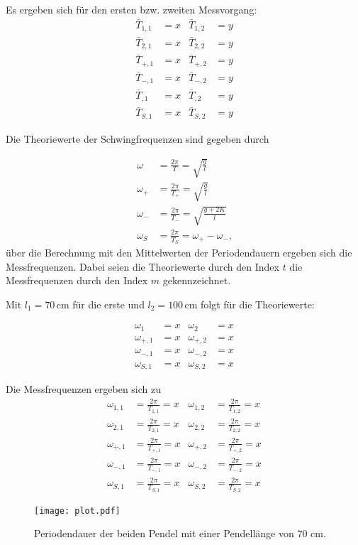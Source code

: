 Es ergeben sich für den ersten bzw. zweiten Messvorgang:
\begin{align}
  \bar{T}_{1,1} & = x  & \bar{T}_{1,2} & = y \\
  \bar{T}_{2,1} & = x  & \bar{T}_{2,2} & = y \\ 
  \bar{T}_{+,1} & = x  & \bar{T}_{+,2} & = y \\
  \bar{T}_{-,1} & = x  & \bar{T}_{-,2} & = y \\
  \bar{T}_{,1}  & = x  & \bar{T}_{,2}  & = y \\
  \bar{T}_{S,1} & = x  & \bar{T}_{S,2} & = y 
\end{align}

Die Theoriewerte der Schwingfrequenzen sind gegeben durch

\begin{align}
  \omega   & = \frac{2π}{T}     =   \sqrt{\frac{g}{l}} \\
  \omega_+ & = \frac{2π}{T_+} =   \sqrt{\frac{g}{l}} \\
  \omega_- & = \frac{2π}{T_-} =\sqrt{\frac{g+2K}{l}} \\
  \omega_S & = \frac{2π}{T_S} =  \omega_+ -\omega_- \text{,}
\end{align}
über die Berechnung mit den Mittelwerten der Periodendauern ergeben sich die Messfrequenzen. Dabei seien die Theoriewerte durch den Index $t$
die Messfrequenzen durch den Index $m$ gekennzeichnet.

Mit $l_1=70 \, \unit{\centi\meter}$ für die erste und $l_2= 100 \, \unit{\centi\meter}$ folgt für die Theoriewerte:

\begin{align}
\omega_1 & = x & \omega_2 & = x \\
\omega_{+,1} & = x & \omega_{+,2} & = x \\
\omega_{-,1} & = x & \omega_{-,2} & = x \\
\omega_{S,1} & = x & \omega_{S,2} & = x 
\end{align}

Die Messfrequenzen ergeben sich zu
\begin{align}
\omega_{1,1} & = \frac{2π}{T_{1,1}}   = x & \omega_{1,2} & =  \frac{2π}{T_{1,2}}   = x \\
\omega_{2,1} & = \frac{2π}{T_{2,1}}  = x & \omega_{2,2} & =  \frac{2π}{T_{2,2}}  = x \\
\omega_{+,1} & = \frac{2π}{T_{+,1}}  = x & \omega_{+,2} & =  \frac{2π}{T_{+,2}}  = x \\
\omega_{-,1} & = \frac{2π}{T_{-,1}}  = x & \omega_{-,2} & =  \frac{2π}{T_{-,2}}  = x \\
\omega_{S,1} & = \frac{2π}{T_{S,1}} = x & \omega_{S,2} & =   \frac{2π}{T_{S,2}}     = x
\end{align} 



\begin{figure}
  \centering
  \texttt{[image: plot.pdf]}
  \caption{Periodendauer der beiden Pendel mit einer Pendellänge von 70 cm.}
  \label{fig:plot}
\end{figure}


